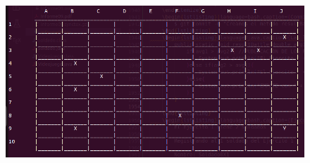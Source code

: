 \documentclass{article}
\begin{document}
	\begin{figure}[H]
		\centering
		\includegraphics[width=1.0\textwidth,keepaspectratio]{img/Commit10.png}
	\end{figure}
\end{document}
